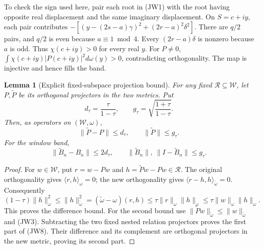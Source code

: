 \documentclass[11pt]{article}
\newtheorem{lemma}{Lemma}
\begin{document}
To check the sign used here, pair each root in (JW1) with the root
having opposite real displacement and the same imaginary displacement.
On \(S=c+iy\), each pair contributes
\(-[(y-(2s-a)\gamma)^2+(2r-a)^2\delta^2]\).
There are \(q/2\) pairs, and \(q/2\) is even because \(a\equiv1\bmod4\).
Every \((2r-a)\delta\) is nonzero because \(a\) is odd.
Thus \(\chi(c+iy)>0\) for every real \(y\).  For \(P\ne0\),
\(\int\chi(c+iy)|P(c+iy)|^2d\omega(y)>0\), contradicting orthogonality.
The map is injective and hence fills the band.

\begin{lemma}[Explicit fixed-subspace projection bound]
For any fixed \(\mathcal R\subseteq\mathcal W\), let \(P,\widetilde P\)
be its orthogonal projectors in the two metrics.  Put
\[
d_\tau=\frac{\tau}{1-\tau},\qquad
g_\tau=\sqrt{\frac{1+\tau}{1-\tau}}.
\]
Then, as operators on \((\mathcal W,\omega)\),
\[
\|\widetilde P-P\|\le d_\tau,\qquad
\|\widetilde P\|\le g_\tau.
\tag{JW7}
\]
For the window band,
\[
\|\widetilde B_n-B_n\|\le2d_\tau,\qquad
\|\widetilde B_n\|,\ \|I-\widetilde B_n\|\le g_\tau.
\tag{JW8}
\]
\end{lemma}
\begin{proof}
For \(w\in\mathcal W\), put \(r=w-Pw\) and
\(h=\widetilde Pw-Pw\in\mathcal R\).  The original orthogonality gives
\(\langle r,h\rangle_\omega=0\); the new orthogonality gives
\(\langle r-h,h\rangle_{\widetilde\omega}=0\).
Consequently
\[
(1-\tau)\|h\|_\omega^2
\le \|h\|_{\widetilde\omega}^2
= (\widetilde\omega-\omega)(r,h)
\le\tau\|r\|_\omega\|h\|_\omega
\le\tau\|w\|_\omega\|h\|_\omega.
\]
This proves the difference bound.  For the second bound use
\(\|\widetilde Pw\|_{\widetilde\omega}\le
\|w\|_{\widetilde\omega}\) and (JW3).
Subtracting the two fixed nested relation projectors proves the first
part of (JW8).  Their difference and its complement are orthogonal
projectors in the new metric, proving its second part.
\end{proof}
\end{document}
